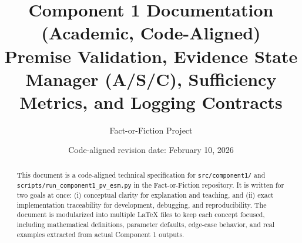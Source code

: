 \documentclass[11pt]{article}
\title{\textbf{Component 1 Documentation (Academic, Code-Aligned)}\\
Premise Validation, Evidence State Manager (A/S/C), Sufficiency Metrics, and Logging Contracts}
\author{Fact-or-Fiction Project}
\date{Code-aligned revision date: February 10, 2026}
\begin{document}
\maketitle

\begin{abstract}
This document is a code-aligned technical specification for \texttt{src/component1/} and
\texttt{scripts/run\_component1\_pv\_esm.py} in the Fact-or-Fiction repository.
It is written for two goals at once: (i) conceptual clarity for explanation and teaching,
and (ii) exact implementation traceability for development, debugging, and reproducibility.
The document is modularized into multiple \LaTeX{} files to keep each concept focused,
including mathematical definitions, parameter defaults, edge-case behavior,
and real examples extracted from actual Component 1 outputs.
\end{abstract}

\tableofcontents
\newpage











\end{document}
